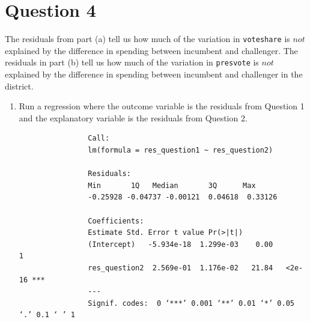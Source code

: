 \documentclass[12pt,letterpaper]{article}
\begin{document}
\newpage	
\section*{Question 4}
\noindent The residuals from part (a) tell us how much of the variation in \texttt{voteshare} is $not$ explained by the difference in spending between incumbent and challenger. The residuals in part (b) tell us how much of the variation in \texttt{presvote} is $not$ explained by the difference in spending between incumbent and challenger in the district.
	\begin{enumerate}
		\item Run a regression where the outcome variable is the residuals from Question 1 and the explanatory variable is the residuals from Question 2.	\\
		\begin{doublespace}
			
		\end{doublespace}
		
		\begin{footnotesize}
			\begin{verbatim}
				Call:
				lm(formula = res_question1 ~ res_question2)
				
				Residuals:
				Min       1Q   Median       3Q      Max 
				-0.25928 -0.04737 -0.00121  0.04618  0.33126 
				
				Coefficients:
				Estimate Std. Error t value Pr(>|t|)    
				(Intercept)   -5.934e-18  1.299e-03    0.00        1    
				res_question2  2.569e-01  1.176e-02   21.84   <2e-16 ***
				---
				Signif. codes:  0 ‘***’ 0.001 ‘**’ 0.01 ‘*’ 0.05 ‘.’ 0.1 ‘ ’ 1
				

\end{verbatim}
\end{footnotesize}
\end{enumerate}
\end{document}
